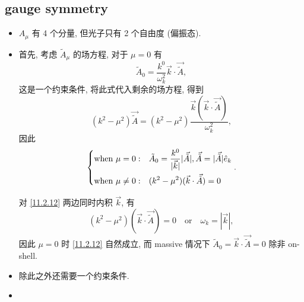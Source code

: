 \subsection{gauge symmetry}
\begin{itemize}
	\item $A_\mu$ 有 4 个分量, 但光子只有 2 个自由度 (偏振态).
	
	\item 首先, 考虑 $\tilde{A}_\mu$ 的场方程, 对于 $\mu = 0$ 有
	\begin{equation}
		\tilde{A}_0 = \frac{k^0}{\omega_k^2} \vec{k} \cdot \vec{\tilde{A}},
	\end{equation}
	这是一个约束条件, 将此式代入剩余的场方程, 得到
	\begin{equation} \label{11.2.12}
		(k^2 - \mu^2) \vec{\tilde{A}} = (k^2 - \mu^2) \frac{\vec{k} (\vec{k} \cdot \vec{\tilde{A}})}{\omega_k^2},
	\end{equation}
	因此
	\begin{equation}
		\begin{dcases}
			\text{when} \ \mu = 0: & \tilde{A}_0 = \frac{k^0}{|\vec{k}|} |\vec{\tilde{A}}|, \vec{\tilde{A}} = |\vec{\tilde{A}}| \hat{e}_k \\
			\text{when} \ \mu \neq 0: & (k^2 - \mu^2) (\vec{k} \cdot \vec{\tilde{A}}) = 0
		\end{dcases}.
	\end{equation}
	
	\begin{tcolorbox}[title=calculation:]
		对 \eqref{11.2.12} 两边同时内积 $\vec{k}$, 有
		\begin{equation}
			(k^2 - \mu^2) (\vec{k} \cdot \vec{\tilde{A}}) = 0 \quad \text{or} \quad \omega_k = |\vec{k}|,
		\end{equation}
		因此 $\mu = 0$ 时 \eqref{11.2.12} 自然成立, 而 massive 情况下 $\tilde{A}_0 = \vec{k} \cdot \vec{\tilde{A}} = 0$ 除非 on-shell.
	\end{tcolorbox}
	
	\item 除此之外还需要一个约束条件.
	
	\item 
\end{itemize}

